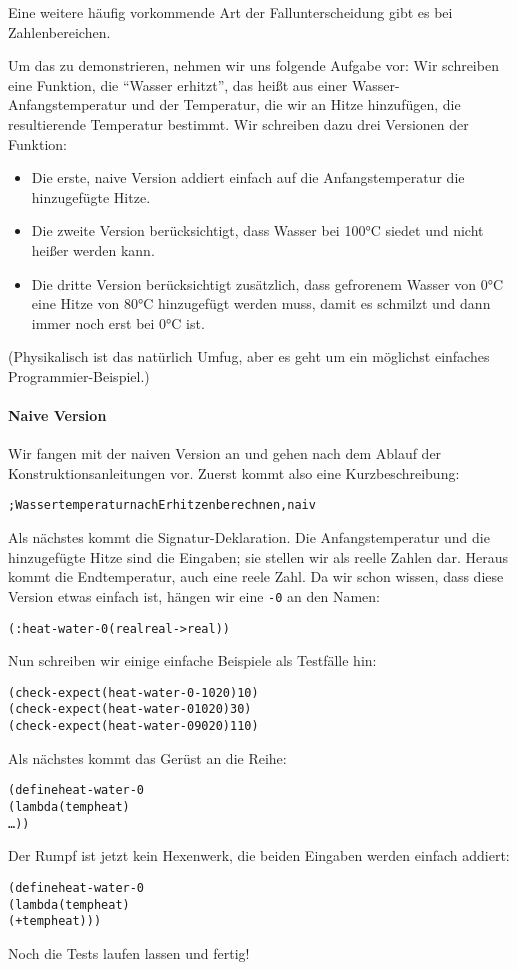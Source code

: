 Eine weitere häufig vorkommende Art der Fallunterscheidung gibt es bei
Zahlenbereichen.

Um das zu demonstrieren, nehmen wir uns folgende Aufgabe vor: Wir
schreiben eine Funktion, die "`Wasser erhitzt"', das heißt aus einer
Wasser-Anfangstemperatur und der Temperatur, die wir an Hitze hinzufügen, die
resultierende Temperatur bestimmt.  Wir schreiben dazu drei Versionen der
Funktion:
%
\begin{itemize}
\item Die erste, naive Version addiert einfach auf die
  Anfangstemperatur die hinzugefügte Hitze.
\item Die zweite Version berücksichtigt, dass Wasser bei 100°C siedet
  und nicht heißer werden kann.
\item Die dritte Version berücksichtigt zusätzlich, dass gefrorenem
  Wasser von 0°C eine Hitze von 80°C hinzugefügt werden muss, damit es
  schmilzt und dann immer noch erst bei 0°C ist.
\end{itemize}
%
(Physikalisch ist das natürlich Umfug, aber es geht
um ein möglichst einfaches Programmier-Beispiel.)

\paragraph{Naive Version} Wir fangen mit der naiven Version an und gehen nach dem Ablauf der
Konstruktionsanleitungen vor.  Zuerst kommt also eine
Kurzbeschreibung:
%
\begin{alltt}
; Wassertemperatur nach Erhitzen berechnen, naiv
\end{alltt}
%
Als nächstes kommt die Signatur-Deklaration.  Die Anfangstemperatur
und die hinzugefügte Hitze sind die Eingaben; sie stellen wir als
reelle Zahlen dar.  Heraus kommt die Endtemperatur, auch eine reele
Zahl.  Da wir schon wissen, dass diese Version etwas einfach ist,
hängen wir eine \texttt{-0} an den Namen:
%
\begin{alltt}
(: heat-water-0 (real real -> real))
\end{alltt}                
%
Nun schreiben wir einige einfache Beispiele als Testfälle hin:
%
\begin{alltt}
(check-expect (heat-water-0 -10 20) 10)
(check-expect (heat-water-0 10 20) 30)
(check-expect (heat-water-0 90 20) 110)
\end{alltt}
%
Als nächstes kommt das Gerüst an die Reihe:
%
\begin{alltt}
(define heat-water-0
  (lambda (temp heat)
    \ldots))
\end{alltt}
%
Der Rumpf ist jetzt kein Hexenwerk, die beiden Eingaben werden
einfach addiert:
%
\begin{alltt}
(define heat-water-0
  (lambda (temp heat)
    (+ temp heat)))
\end{alltt}
%
Noch die Tests laufen lassen und fertig!

